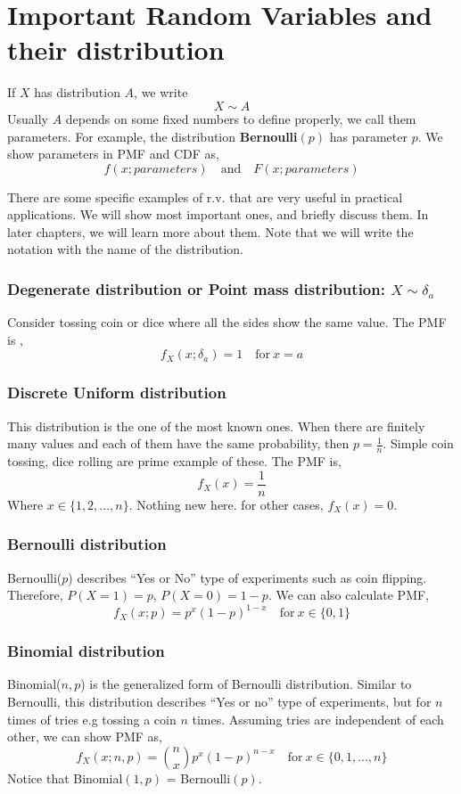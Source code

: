 \section{Important Random Variables and their distribution}
\begin{definition}
    If $X$ has distribution $A$, we write
    \[ X \sim A\]
    Usually $A$ depends on some fixed numbers to define properly, we call them \alert{parameters}. For example, the distribution
    \textbf{Bernoulli}$(p)$ has parameter $p$. We show parameters in PMF and CDF as,
    \[ f(x; parameters) \quad \text{and} \quad F(x; parameters) \]

\end{definition}
There are some specific examples of r.v. that are very useful in practical applications. We will show most important ones, and briefly
discuss them. In later chapters, we will learn more about them. Note that we will write the notation with the name of the distribution.

\subsubsection{Degenerate distribution or Point mass distribution: $X \sim \delta_a$}
Consider tossing coin or dice where all the sides show the same value. The PMF is ,
\[f_X(x; \delta_a) = 1 \quad \text{for} \ x = a\]
\subsubsection{Discrete Uniform distribution}
This distribution is the one of the most known ones. When there are finitely many values and each of them have the same probability, then
$p = \frac{1}{n}$. Simple coin tossing, dice rolling are prime example of these. The PMF is,
\[f_X(x) = \frac{1}{n}\]
Where $x \in \{1,2,...,n \}$. Nothing new here.
for other cases, $f_X(x) = 0$.
\subsubsection*{Bernoulli distribution}
Bernoulli($p$) describes ``Yes or No'' type of experiments such as coin flipping. Therefore, $P(X = 1) = p$, $P(X = 0) = 1-p$. We can
also calculate PMF,
\[f_X(x; p) = p^x(1-p)^{1-x} \quad \text{for} \ x \in \{0,1\}\]

\subsubsection*{Binomial distribution}
Binomial($n,p$) is the generalized form of Bernoulli distribution. Similar to Bernoulli, this distribution describes ``Yes or no''
type of experiments, but for $n$ times of tries e.g tossing a coin $n$ times. Assuming tries are independent of each other, we can show PMF as,
\[f_X(x; n,p) = \binom{n}{x}p^x(1-p)^{n-x} \quad \text{for} \ x \in \{0,1,...,n\}\]
Notice that Binomial$(1,p)$ = Bernoulli$(p)$.

